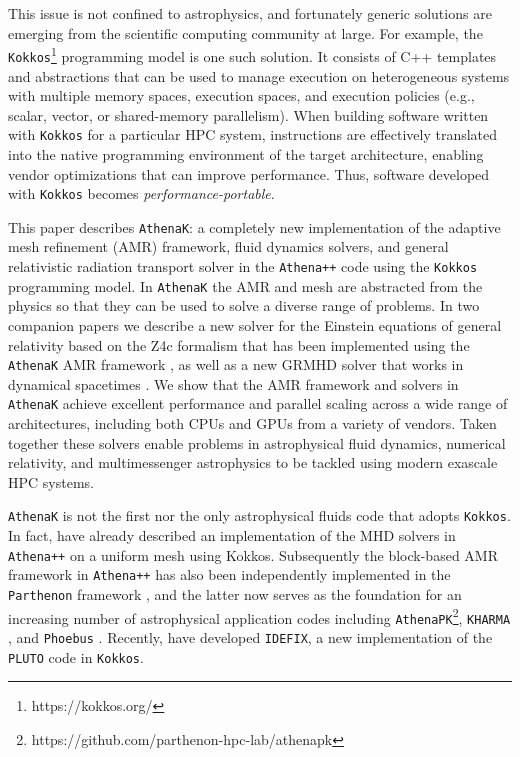 \documentclass[twocolumn, floatfix]{aastex63}
\newcommand{\app}{\texttt{Athena++}}
\newcommand{\ak}{\texttt{AthenaK}}
\newcommand{\kokkos}{\texttt{Kokkos}}
\newcommand{\parth}{\texttt{Parthenon}}
\begin{document}
This issue is not confined to astrophysics, and fortunately generic solutions are emerging from the scientific computing community at large.  For example, the \kokkos{}\footnote{https://kokkos.org/} programming model \citep{9485033} is one such solution. It consists of C++ templates and abstractions that can be used
to manage execution on heterogeneous systems with multiple memory spaces, execution spaces, and execution policies (e.g., scalar, vector, or shared-memory parallelism). When building software written with \kokkos{} for a particular HPC system, instructions are effectively translated into the native programming environment of the target architecture, enabling vendor optimizations that can improve performance.  Thus, software developed with \kokkos{} becomes {\em performance-portable}.

This paper describes \ak{}: a completely new implementation of the adaptive mesh refinement (AMR) framework, fluid dynamics solvers, and general relativistic radiation transport solver in the 
\app{} code \citep[hereafter S20]{Stone2020ApJS..249....4S} using the \kokkos{} programming model.
In \ak{} the AMR and mesh are abstracted from the physics so that they can be used to solve a diverse range of problems.  In two companion papers we describe a new solver for the Einstein equations of general relativity based on the Z4c formalism that has been implemented using the \ak{} AMR framework \citep{Zhu.9.24}, as well as a new GRMHD solver that 
works in dynamical spacetimes \citep{Fields.9.24}.
We show that the AMR framework and solvers in \ak{} achieve excellent performance and parallel scaling across a wide range of 
architectures, including both CPUs and GPUs from a variety of vendors.
Taken together these solvers enable problems in astrophysical fluid dynamics, numerical relativity, and multimessenger astrophysics to be tackled using modern exascale HPC systems.

\ak{} is not the first nor the only astrophysical fluids code that adopts \kokkos{}.  In fact, \cite{grete2021} have already described an implementation of the MHD solvers in \app{} on a uniform mesh using Kokkos. Subsequently the block-based AMR framework in \app{} has also been independently implemented in the \parth{} framework \citep{grete2022}, and the latter now serves as the foundation for an increasing number of astrophysical application codes including \texttt{AthenaPK}\footnote{https://github.com/parthenon-hpc-lab/athenapk}, \texttt{KHARMA} \citep[described in][]{prather2024}, and \texttt{Phoebus} \citep{2023AAS...24110547R}.  Recently, \cite{lesur2023} have developed \texttt{IDEFIX}, a new implementation of the \texttt{PLUTO} code \citep{mignone2012ApJS..198....7M} in \kokkos{}.
\end{document}
